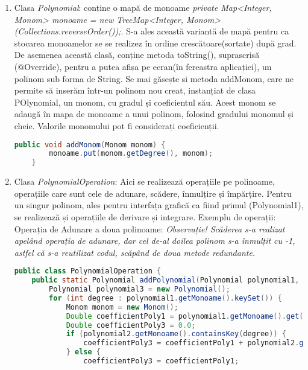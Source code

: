 \documentclass[a4paper,12pt]{article}
\begin{document}
\begin{enumerate}
\begin{enumerate}
\item Clasa \emph{Polynomial}: conține o mapă de monoame \emph{private Map<Integer, Monom> monoame = new TreeMap<Integer, Monom>(Collections.reverseOrder());}. S-a ales această variantă de mapă pentru ca stocarea monoamelor se se realizez în ordine crescătoare(sortate) după grad.
De asemenea această clasă, conține metoda toString(), suprascrisă (@Override), pentru a putea afișa pe ecran(în fereastra aplicației), un polinom sub forma de String.
Se mai găsește si metoda addMonom, care ne permite să inserăm într-un polinom nou creat, instanțiat de clasa POlynomial, un monom, cu gradul și coeficientul său. Acest monom se adaugă în mapa de monoame a unui polinom, folosind gradului monomul și cheie. Valorile monomului pot fi considerați coeficienții.
\newline
\begin{lstlisting}[language = Java]
 public void addMonom(Monom monom) {
        monoame.put(monom.getDegree(), monom); 
    }
\end{lstlisting}
\newline
\item Clasa \emph{PolynomialOperation}: Aici se realizează operațiile pe polinoame, operațiile care sunt cele de adunare, scădere, înmulțire și împărțire. Pentru un singur polinom, ales pentru interfața grafică ca fiind primul (Polynomial1), se realizează și operațiile de derivare și integrare.
\newline
Exemplu de operații:
\newline
Operația de Adunare a doua polinoame: 
\newline
\emph{Observație! Scăderea s-a realizat apelând operația de adunare, dar cel de-al doilea polinom s-a înmulțit cu -1, astfel că s-a reutilizat codul, scăpând de doua metode redundante.}
\newline
\begin{lstlisting}[language = Java]
public class PolynomialOperation {
    public static Polynomial addPolynomial(Polynomial polynomial1, Polynomial polynomial2) {
        Polynomial polynomial3 = new Polynomial();
        for (int degree : polynomial1.getMonoame().keySet()) {
            Monom monom = new Monom();
            Double coefficientPoly1 = polynomial1.getMonoame().get(degree).getCoefficient();
            Double coefficientPoly3 = 0.0;
            if (polynomial2.getMonoame().containsKey(degree)) {
                coefficientPoly3 = coefficientPoly1 + polynomial2.getMonoame().get(degree).getCoefficient();
            } else {
                coefficientPoly3 = coefficientPoly1;

\end{lstlisting}
\end{enumerate}
\end{enumerate}
\end{document}
